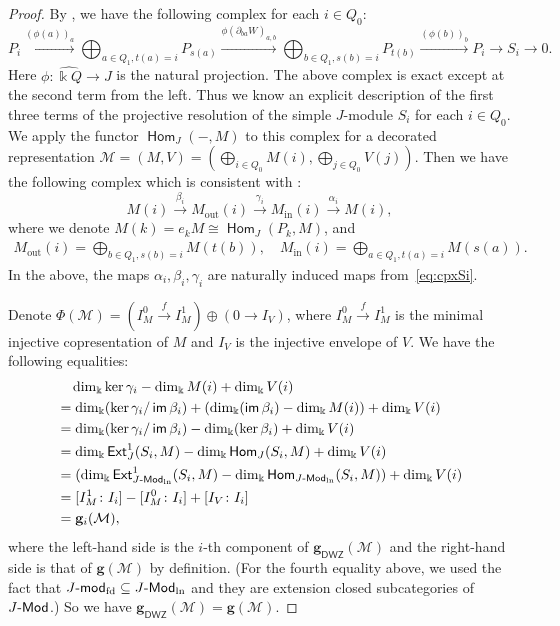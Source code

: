 \documentclass[12pt]{amsart}
\theoremstyle{definition}
\theoremstyle{remark}
\numberwithin{equation}{section}
\newcommand{\opname}[1]{\operatorname{\mathsf{#1}}}
\newcommand{\Ext}{\opname{Ext}}
\newcommand{\Hom}{\opname{Hom}}
\newcommand{\im}{\opname{im}\nolimits}
\newcommand{\Modln}{\mathchar`-\mathsf{Mod}_{\mathrm{ln}}}
\newcommand{\Mod}{\mathchar`-\mathsf{Mod}}
\newcommand{\modfd}{\mathchar`-\mathsf{mod}_{\mathrm{fd}}}
\newcommand{\DWZ}{\mathsf{DWZ}}
\begin{document}
    \begin{proof}
        By \cite[Proposition~4.2]{BIRSm11}, we have the following complex for each $i\in Q_0$:
    \begin{equation}\label{eq:cpxSi}
        P_i\xrightarrow{(\phi(a))_a} \bigoplus_{a\in Q_1, t(a)=i} P_{s(a)} \xrightarrow{\phi(\partial_{ba}W)_{a,b}} \bigoplus_{b\in Q_1, s(b)=i} P_{t(b)} \xrightarrow{(\phi(b))_b} P_i \to S_i \to 0.
    \end{equation}
    Here $\phi\colon \widehat{\Bbbk Q} \to J$ is the natural projection.
    The above complex is exact except at the second term from the left. Thus we know an explicit description of the first three terms of the projective resolution of the simple $J$-module $S_i$ for each $i\in Q_0$.
    We apply the functor $\Hom_J(-, M)$ to this complex for a decorated representation $\mathcal{M}=(M, V)= (\bigoplus_{i\in Q_0} M(i), \bigoplus_{j\in Q_0} V(j))$. Then we have the following complex which is consistent with \cite[(1.8)]{DWZ10}:
    \[M(i)\xrightarrow{\beta_i}M_{\mathrm{out}}(i)\xrightarrow{\gamma_i}M_{\mathrm{in}}(i) \xrightarrow{\alpha_i} M(i),\]
    where we denote $M(k)=e_k M\cong \Hom_J(P_k, M)$, and
    \begin{align*}
        M_{\mathrm{out}}(i)=\bigoplus_{b\in Q_1, s(b)=i} M(t(b)),\quad M_{\mathrm{in}}(i)=\bigoplus_{a\in Q_1, t(a)=i} M(s(a)).
    \end{align*}
    In the above, the maps $\alpha_i, \beta_i, \gamma_i$ are naturally induced maps from~\eqref{eq:cpxSi}. 

    
    Denote $\Phi(\mathcal{M})=(I_{M}^0\xrightarrow{f} I_{M}^1)\oplus (0\to I_{V})$,
     where $I_M^0 \xrightarrow{f} I_M^1$ is the minimal injective copresentation of $M$ and $I_{V}$ is the injective envelope of $V$. We have the following equalities:
    \begin{align*}
        & \quad \dim_{\Bbbk} \ker \gamma_i - \dim_{\Bbbk} M(i) + \dim_{\Bbbk} V(i)\\ 
        &= \dim_{\Bbbk}(\ker \gamma_i/\im \beta_i) + (\dim_{\Bbbk}(\im \beta_i) - \dim_{\Bbbk} M(i)) + \dim_{\Bbbk} V(i)\\ 
        &= \dim_{\Bbbk}(\ker \gamma_i/\im \beta_i) - \dim_{\Bbbk}(\ker\beta_i) + \dim_{\Bbbk} V(i)\\
        &=\dim_{\Bbbk}\Ext^1_J(S_i, M) - \dim_{\Bbbk}\Hom_J(S_i, M) +  \dim_{\Bbbk} V(i)\\
        &=(\dim_{\Bbbk}\Ext^1_{J\Modln}(S_i, M) - \dim_{\Bbbk}\Hom_{J\Modln}(S_i, M)) +  \dim_{\Bbbk} V(i)\\
        &= [I_M^1\colon I_i]-[I_M^0\colon I_i]+ [I_V\colon I_i]\\
        &= \mathbf{g}_i(\mathcal{M}),
    \end{align*}
    where the left-hand side is the $i$-th component of $\mathbf{g}_\DWZ(\mathcal{M})$ and the right-hand side is that of $\mathbf{g}(\mathcal{M})$ by definition.
    (For the fourth equality above, we used the fact that $J\modfd\subseteq J\Modln$ and they are extension closed subcategories of $J\Mod$.)  So we have $\mathbf{g}_\DWZ(\mathcal{M})=\mathbf{g}(\mathcal{M})$. 


\end{proof}
\end{document}
